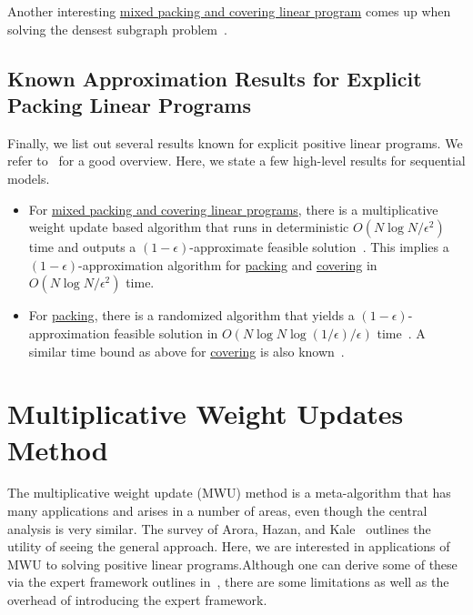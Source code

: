 \begin{eg}
	Another interesting \hyperref[def:mixed-packing-covering-LP]{mixed packing and covering linear program} comes up when solving the densest subgraph problem~\cite{bahmani2014efficient}.
\end{eg}

\subsection{Known Approximation Results for Explicit Packing Linear Programs}

Finally, we list out several results known for explicit positive linear programs. We refer to~\cite{quanrud2019fast,wang2017fast} for a good overview. Here, we state a few high-level results for sequential models.
\begin{itemize}
	\item For \hyperref[def:mixed-packing-covering-LP]{mixed packing and covering linear programs}, there is a multiplicative weight update based algorithm that runs in deterministic \(O(N \log N / \epsilon ^2)\) time and outputs a \((1 - \epsilon )\)-approximate feasible solution~\cite{young2014nearly}. This implies a \((1 - \epsilon )\)-approximation algorithm for \hyperref[def:packing-LP]{packing} and \hyperref[def:covering-LP]{covering} in \(O(N \log N / \epsilon ^2)\) time.
	\item For \hyperref[def:packing-LP]{packing}, there is a randomized algorithm that yields a \((1 - \epsilon )\)-approximation feasible solution in \(O(N \log N \log (1 / \epsilon ) / \epsilon )\) time~\cite{allen2015nearly}. A similar time bound as above for \hyperref[def:covering-LP]{covering} is also known~\cite{wang2015unified}.
\end{itemize}

\section{Multiplicative Weight Updates Method}
The multiplicative weight update (MWU) method is a meta-algorithm that has many applications and arises in a number of areas, even though the central analysis is very similar. The survey of Arora, Hazan, and Kale~\cite{arora2012multiplicative} outlines the utility of seeing the general approach. Here, we are interested in applications of MWU to solving positive linear programs.Although one can derive some of these via the expert framework outlines in~\cite{arora2012multiplicative}, there are some limitations as well as the overhead of introducing the expert framework.

